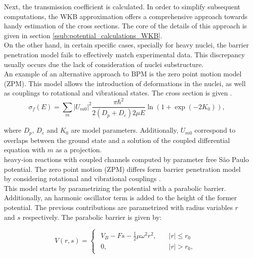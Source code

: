 \documentclass[openany]{book}
\begin{document}
Next, the transmission coefficient is calculated. In order to simplify subsequent computations, the WKB approximation offers a comprehensive approach towards handy estimation of the cross sections. The core of the details of this approach is given in section \ref{ssub:potential_calculations_WKB}. \\

On the other hand, in certain specific cases, specially for heavy nuclei, the barrier penetration model fails to effectively match experimental data. This discrepancy usually occurs due the lack of consideration of nuclei substructure. \\

An example of an alternative approach to BPM is the zero point motion model (ZPM). This model allows the introduction of deformations in the nuclei, as well as couplings to rotational and vibrational states. The cross section is given \cite{guimin_deji_xiaowu_1992}. \\

\begin{equation}\label{eq:middleFusion_fusionCrossSection}
	\sigma_f(E) = \sum_{m} {|U_{m0}|^2 \frac{\pi \hbar^2}{2(D_p + D_c)2\mu E} \ln {(1 + \exp {(-2K_0)})} },
\end{equation}

where $D_p$, $D_c$ and $K_0$ are model parameters. Additionally, $U_{m0}$ correspond to overlaps between the ground state and a solution of the coupled differential equation with $m$ as a projection.\\

heavy-ion reactions with coupled channels computed by parameter free São Paulo potential. The zero point motion  (ZPM) differs form barrier penetration model by considering rotational and  vibrational couplings \cite{nobre_chamon_gasques_carlson_thompson_2007}. \\

This model starts by parametrizing the potential with a parabolic barrier. Additionally, an harmonic oscillator term is added to the height of the former potential. The previous contributions are parametrized with radius variables $r$ and $s$ respectively. The parabolic barrier is given by: 

\begin{equation}\label{eq:potential_ZPM_parabolic}
	V(r, s) = 	\left\{\begin{array}{l}
		\begin{split}
			V_B - Fs - \frac{1}{2} \mu \omega^2 r^2 , \quad & |r| \le r_0 \\ 
			0, \quad & |r| > r_0,
		\end{split}
	\end{array}\right.
\end{equation}
\end{document}
